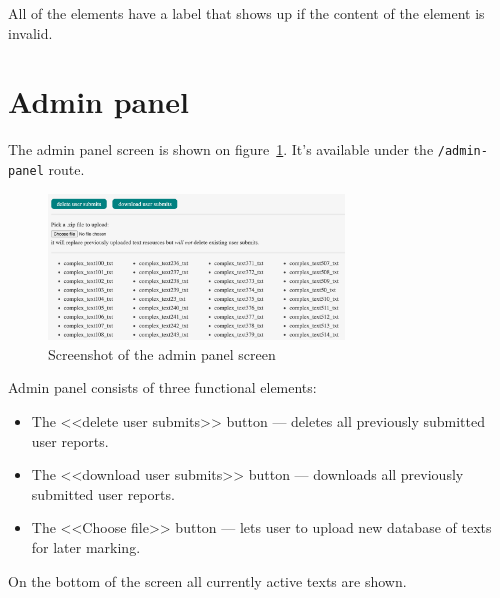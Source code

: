 \documentclass[a4paper,14pt,oneside,final]{memoir}
\begin{document}
All of the elements have a label that shows up if the content of the element is invalid. 

\section{Admin panel}
The admin panel screen is shown on figure~\ref{fig:ui_admin}. It's available under the \texttt{/admin-panel} route.

\begin{figure}[h]
    \centering
    \includegraphics[width=0.7\textwidth]{fig_ui_admin}
    \caption{Screenshot of the admin panel screen}
    \label{fig:ui_admin}
\end{figure}

Admin panel consists of three functional elements: 
\begin{itemize}
    \item The <<delete user submits>> button --- deletes all previously submitted user reports.
    \item The <<download user submits>> button --- downloads all previously submitted user reports.
    \item The <<Choose file>> button --- lets user to upload new database of texts for later marking.
\end{itemize}

On the bottom of the screen all currently active texts are shown. 
\end{document}

